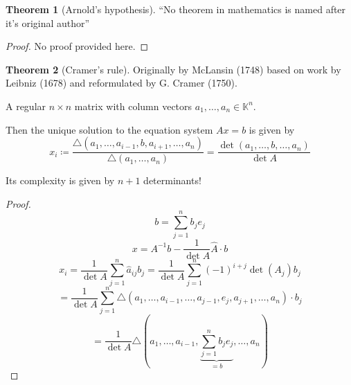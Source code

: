 \documentclass[a4paper,landscape,twocolumn]{article}
\theoremstyle{definition}
\newtheorem{theorem}{Theorem}
\begin{document}
\begin{theorem}[Arnold's hypothesis]
  \enquote{No theorem in mathematics is named after it's original author}
\end{theorem}
\begin{proof}
  No proof provided here.
\end{proof}

\begin{theorem}[Cramer's rule]
  Originally by McLansin (1748) based on work by Leibniz (1678) and reformulated by G. Cramer (1750).

  A regular $n\times n$ matrix with column vectors $a_1, \ldots, a_n \in \mathbb K^n$.

  Then the unique solution to the equation system $Ax = b$ is given by
  \[
    x_i \coloneqq
    \frac{\triangle(a_1, \ldots, a_{i-1}, b, a_{i+1}, \ldots, a_n)}{\triangle(a_1, \ldots, a_n)}
    = \frac{\det(a_1,\ldots,b,\ldots,a_n)}{\det{A}}
  \]

  Its complexity is given by $n+1$ determinants!
\end{theorem}
\begin{proof}
  \[ b = \sum_{j=1}^{n} b_j e_j \]
  \[ x = A^{-1} b - \frac{1}{\det{A}} \hat{A} \cdot b \]
  \[ x_i = \frac{1}{\det{A}} \sum_{j=1}^{n} \hat{a}_{ij} b_j = \frac{1}{\det{A}} \sum_{j=1}^{n} (-1)^{i+j} \det{(A_j)} b_j \]
  \[ = \frac{1}{\det{A}} \sum_{j=1}^n \triangle (a_1, \ldots, a_{i-1}, \ldots, a_{j-1}, e_j, a_{j+1}, \ldots, a_n) \cdot b_j \]
  \[ = \frac{1}{\det{A}} \triangle (a_1, \ldots, a_{i-1}, \underbrace{\sum_{j=1}^n b_j e_j}_{=b}, \ldots, a_n) \]
\end{proof}

\end{document}
